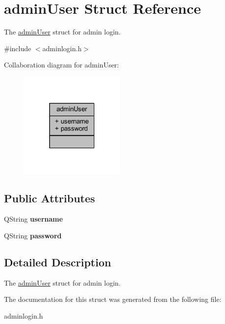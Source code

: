 \hypertarget{structadmin_user}{}\section{admin\+User Struct Reference}
\label{structadmin_user}


The \hyperlink{structadmin_user}{admin\+User} struct for admin login.  




{\ttfamily \#include $<$adminlogin.\+h$>$}



Collaboration diagram for admin\+User\+:
\nopagebreak
\begin{figure}[H]
\begin{center}
\leavevmode
\includegraphics[width=148pt]{structadmin_user__coll__graph}
\end{center}
\end{figure}
\subsection*{Public Attributes}
\begin{DoxyCompactItemize}
\item 
\mbox{\label{structadmin_user_a13bf29c825d552c1eaab62584796f818}} 
Q\+String {\bfseries username}
\item 
\mbox{\label{structadmin_user_aa444478d445577e13b3744f342fce4b0}} 
Q\+String {\bfseries password}
\end{DoxyCompactItemize}


\subsection{Detailed Description}
The \hyperlink{structadmin_user}{admin\+User} struct for admin login. 

The documentation for this struct was generated from the following file\+:\begin{DoxyCompactItemize}
\item 
adminlogin.\+h\end{DoxyCompactItemize}
